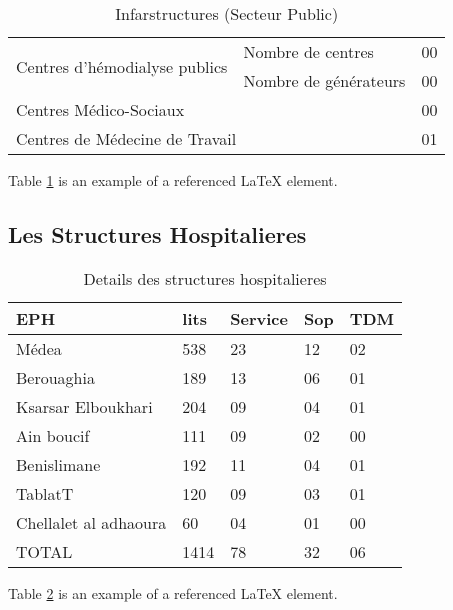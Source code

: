 \begin{table}[h!]
\begin{center}
\begin{tabular}{|p{6cm}|p{6cm}|p{1cm}|}
 \hline
 \multirow{2}{*}{Centres  d’hémodialyse publics}&Nombre de centres              &00\\
                                                &Nombre de générateurs          &00\\
 \hline
 \multicolumn{2}{|l|}{Centres Médico-Sociaux}                                   &00 \\
 \multicolumn{2}{|l|}{Centres de Médecine de Travail}                           &01 \\
 \hline
\end{tabular}
\end{center}
\caption{Infarstructures (Secteur Public)}
\label{table:1}
\end{table}
Table \ref{table:1} is an example of a referenced \LaTeX{} element.


\subsection{Les Structures Hospitalieres}
\begin{table}[h!]
\begin{center}
\begin{tabular}{|p{6cm}|p{1.5cm}|p{1.5cm}|p{1.5cm}|p{1cm}|}
 \hline
EPH                     &lits	    &Service	    &Sop	      &TDM \\
\hline
Médea	                  &538      &23           &12	        &02\\
Berouaghia	            &189	    &13	          &06	        &01\\
Ksarsar Elboukhari      &204	    &09	          &04	        &01\\
Ain boucif	            &111	    &09	          &02	        &00\\
Benislimane             &192	    &11	          &04	        &01\\
TablatT	                &120	    &09	          &03	        &01\\
Chellalet al adhaoura 	&60	      &04	          &01	        &00\\
\hline
TOTAL	                  &1414	    &78	          &32	        &06\\
\hline

\end{tabular}
\end{center}
\caption{Details des structures hospitalieres}
\label{table:2}
\end{table}
Table \ref{table:2} is an example of a referenced \LaTeX{} element.

